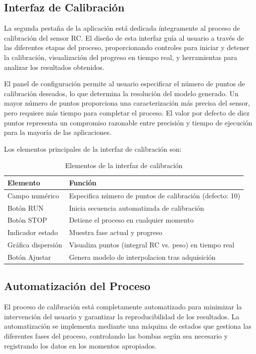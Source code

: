 \documentclass[12pt,a4paper]{article}
\begin{document}
\subsection{Interfaz de Calibración}

La segunda pestaña de la aplicación está dedicada íntegramente al proceso de calibración del sensor RC. El diseño de esta interfaz guía al usuario a través de las diferentes etapas del proceso, proporcionando controles para iniciar y detener la calibración, visualización del progreso en tiempo real, y herramientas para analizar los resultados obtenidos.

El panel de configuración permite al usuario especificar el número de puntos de calibración deseados, lo que determina la resolución del modelo generado. Un mayor número de puntos proporciona una caracterización más precisa del sensor, pero requiere más tiempo para completar el proceso. El valor por defecto de diez puntos representa un compromiso razonable entre precisión y tiempo de ejecución para la mayoría de las aplicaciones.

Los elementos principales de la interfaz de calibración son:

\begin{table}[H]
\centering
\caption{Elementos de la interfaz de calibración}
\begin{tabular}{@{}lp{8cm}@{}}
\toprule
\textbf{Elemento} & \textbf{Función} \\
\midrule
Campo numérico & Especifica número de puntos de calibración (defecto: 10) \\
Botón RUN & Inicia secuencia automatizada de calibración \\
Botón STOP & Detiene el proceso en cualquier momento \\
Indicador estado & Muestra fase actual y progreso \\
Gráfica dispersión & Visualiza puntos (integral RC vs. peso) en tiempo real \\
Botón Ajustar & Genera modelo de interpolacion tras adquisición \\
\bottomrule
\end{tabular}
\end{table}

\subsection{Automatización del Proceso}

El proceso de calibración está completamente automatizado para minimizar la intervención del usuario y garantizar la reproducibilidad de los resultados. La automatización se implementa mediante una máquina de estados que gestiona las diferentes fases del proceso, controlando las bombas según sea necesario y registrando los datos en los momentos apropiados.
\end{document}
